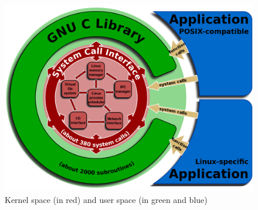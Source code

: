 \documentclass[10pt]{book}
\begin{document}
\begin{figure}[ht]
\includegraphics[width=\textwidth]{images/userspace_kernelspace.png}
\caption{Kernel space (in red) and user space (in green and blue)}
\label{img:userspace_kernelspace}
\end{figure}
\end{document}

